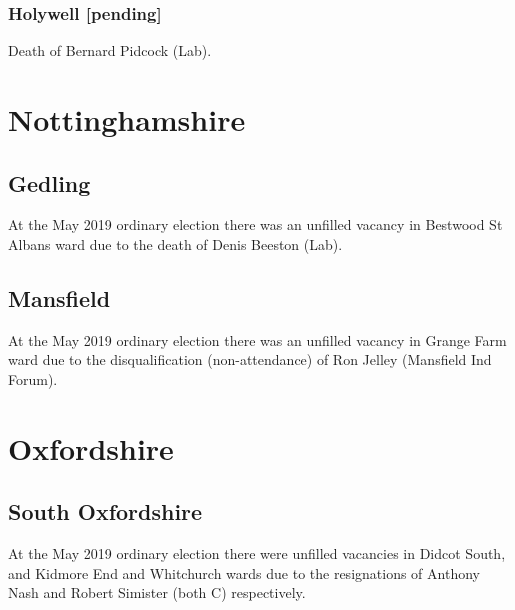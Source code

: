 \documentclass[a4paper,openany]{book}
\begin{document}
\begin{resultsiii}
\subsubsection*{Holywell \hspace*{\fill}\nolinebreak[1]%
	\enspace\hspace*{\fill}
	[pending]}


Death of Bernard Pidcock (Lab).

\section{Nottinghamshire}

\subsection*{Gedling}

At the May 2019 ordinary election there was an unfilled vacancy in Bestwood St Albans ward due to the death of Denis Beeston (Lab).

\subsection*{Mansfield}

At the May 2019 ordinary election there was an unfilled vacancy in Grange Farm ward due to the disqualification (non-attendance) of Ron Jelley (Mansfield Ind Forum).

\section{Oxfordshire}

\subsection*{South Oxfordshire}

At the May 2019 ordinary election there were unfilled vacancies in Didcot South, and Kidmore End and Whitchurch wards due to the resignations of Anthony Nash and Robert Simister (both C) respectively.


\end{resultsiii}
\end{document}
